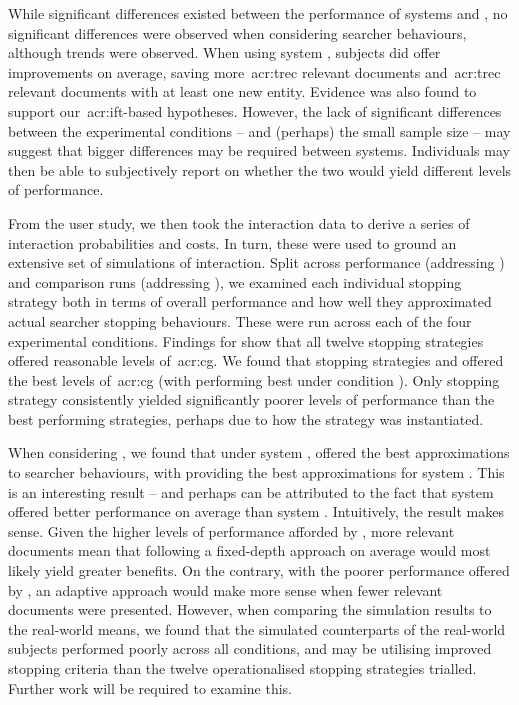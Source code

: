 While significant differences existed between the performance of systems  and , no significant differences were observed when considering searcher behaviours, although trends were observed. When using system , subjects did offer improvements on average, saving more~\gls{acr:trec} relevant documents and~\gls{acr:trec} relevant documents with at least one new entity. Evidence was also found to support our~\gls{acr:ift}-based hypotheses. However, the lack of significant differences between the experimental conditions -- and (perhaps) the small sample size -- may suggest that bigger differences may be required between systems. Individuals may then be able to subjectively report on whether the two would yield different levels of performance.

From the user study, we then took the interaction data to derive a series of interaction probabilities and costs. In turn, these were used to ground an extensive set of simulations of interaction. Split across performance (addressing ) and comparison runs (addressing ), we examined each individual stopping strategy both in terms of overall performance and how well they approximated actual searcher stopping behaviours. These were run across each of the four experimental conditions. Findings for  show that all twelve stopping strategies offered reasonable levels of~\gls{acr:cg}. We found that stopping strategies  and  offered the best levels of~\gls{acr:cg} (with  performing best under condition ). Only stopping strategy  consistently yielded significantly poorer levels of performance than the best performing strategies, perhaps due to how the strategy was instantiated.

When considering , we found that under system ,  offered the best approximations to searcher behaviours, with  providing the best approximations for system . This is an interesting result -- and perhaps can be attributed to the fact that system  offered better performance on average than system . Intuitively, the result makes sense. Given the higher levels of performance afforded by , more relevant documents mean that following a fixed-depth approach on average would most likely yield greater benefits. On the contrary, with the poorer performance offered by , an adaptive approach would make more sense when fewer relevant documents were presented. However, when comparing the simulation results to the real-world means, we found that the simulated counterparts of the real-world subjects performed poorly across all conditions, and may be utilising improved stopping criteria than the twelve operationalised stopping strategies trialled. Further work will be required to examine this.

